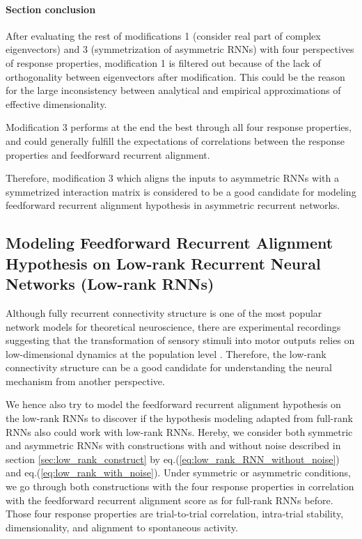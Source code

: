 \documentclass[11pt]{article}
\begin{document}
	\vspace{0.5cm}
	\paragraph{Section conclusion}
	After evaluating the rest of modifications 1 (consider real part of complex eigenvectors) and 3 (symmetrization of asymmetric RNNs) with four perspectives of response properties, modification 1 is filtered out because of the lack of orthogonality between eigenvectors after modification. This could be the reason for the large inconsistency between analytical and empirical approximations of effective dimensionality.
	
	Modification 3 performs at the end the best through all four response properties, and could generally fulfill the expectations of correlations between the response properties and feedforward recurrent alignment. 
	
	Therefore, modification 3 which aligns the inputs to asymmetric RNNs with a symmetrized interaction matrix is considered to be a good candidate for modeling feedforward recurrent alignment hypothesis in asymmetric recurrent networks.
	
	\clearpage
	\subsection{Modeling Feedforward Recurrent Alignment Hypothesis on Low-rank Recurrent Neural Networks (Low-rank RNNs)} \label{sec:low_rank_result}
	Although fully recurrent connectivity structure is one of the most popular network models for theoretical neuroscience, there are experimental recordings suggesting that the transformation of sensory stimuli into motor outputs relies on low-dimensional dynamics at the population level \cite{mastrogiuseppe2018linking}. Therefore, the low-rank connectivity structure can be a good candidate for understanding the neural mechanism from another perspective. 
	
	We hence also try to model the feedforward recurrent alignment hypothesis on the low-rank RNNs to discover if the hypothesis modeling adapted from full-rank RNNs also could work with low-rank RNNs. 
	Hereby, we consider both symmetric and asymmetric RNNs with constructions with and without noise described in section \ref{sec:low_rank_construct} by eq.(\ref{eq:low_rank_RNN_without_noise}) and eq.(\ref{eq:low_rank_with_noise}). Under symmetric or asymmetric conditions, we go through both constructions with the four response properties in correlation with the feedforward recurrent alignment score as for full-rank RNNs before. Those four response properties are trial-to-trial correlation, intra-trial stability, dimensionality, and alignment to spontaneous activity. %
	
\end{document}
